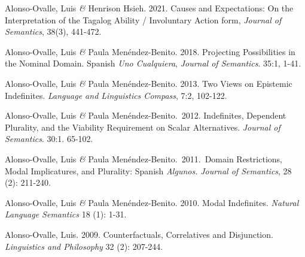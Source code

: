 \documentclass[11pt]{article}
\begin{document}

Alonso-Ovalle, Luis \textit{\&} Henrison Hsieh. 2021. Causes and Expectations: On the Interpretation of the Tagalog Ability / Involuntary Action form, \textit{Journal of Semantics}, 38(3), 441-472.%

Alonso-Ovalle, Luis \textit{\&} Paula Men\'endez-Benito. 2018. Projecting Possibilities in the Nominal Domain. Spanish \textit{Uno Cualquiera}, \textit{Journal of Semantics}. 35:1, 1-41. %


Alonso-Ovalle, Luis \textit{\&} Paula
    Men\'endez-Benito. 2013. Two Views on Epistemic
    Indefinites. \textit{Language and Linguistics Compass}, 7:2, 102-122. 

Alonso-Ovalle, Luis \textit{\&} Paula
    Men\'endez-Benito.\ 2012. Indefinites, Dependent Plurality, and
    the Viability Requirement on Scalar Alternatives. \textit{Journal
      of Semantics}. 30:1. 65-102. %

Alonso-Ovalle, Luis \textit{\&} Paula
    Men\'endez-Benito.\ 2011.\ Domain Restrictions, Modal
    Implicatures, and Plurality: Spanish \textit{Algunos.}
    \textit{Journal of Semantics}, 28 (2): 211-240.


Alonso-Ovalle, Luis \textit{\&} Paula
    Men\'endez-Benito. 2010. Modal Indefinites. \textit{Natural
      Language Semantics} 18 (1): 1-31. 

Alonso-Ovalle, Luis. 2009. Counterfactuals,
  Correlatives and Disjunction. \textit{Linguistics and Philosophy} 32 (2): 207-244.
\end{document}
